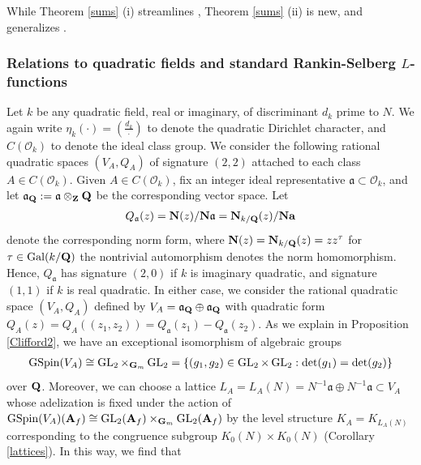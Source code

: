 \documentclass{amsart}
\theoremstyle{definition}
\theoremstyle{definition}
\theoremstyle{definition}
\begin{document}
While Theorem \ref{sums} (i) streamlines \cite[Theorem 4.7]{BY}, Theorem \ref{sums} (ii) is new, and generalizes \cite{VO}.

\subsubsection{Relations to quadratic fields and standard Rankin-Selberg $L$-functions}

Let $k$ be any quadratic field, real or imaginary, of discriminant $d_k$ prime to $N$.
We again write $\eta_k(\cdot) = (\frac{d_k}{\cdot})$ to denote the quadratic Dirichlet character, and $C(\mathcal{O}_k)$ to denote the ideal class group. 
We consider the following rational quadratic spaces $(V_A, Q_A)$ of signature $(2,2)$ attached to each class $A \in C(\mathcal{O}_k)$. 
Given $A \in C(\mathcal{O}_k)$, fix an integer ideal representative $\mathfrak{a} \subset \mathcal{O}_k$, and let 
$\mathfrak{a}_{\bf{Q}} := \mathfrak{a} \otimes_{\bf{Z}} {\bf{Q}}$ be the corresponding vector space. 
Let \begin{align*} Q_{\mathfrak{a}}(z) = {\bf{N}}(z)/{\bf{N}} \mathfrak{a} = {\bf{N}}_{k/{\bf{Q}}}(z)/ {\bf{N}} {\bf{a}} \end{align*} denote the corresponding norm form,
where ${\bf{N}}(z) = {\bf{N}}_{k/{\bf{Q}}}(z) = z z^{\tau}$ for $\tau \in \operatorname{Gal}(k/{\bf{Q}})$ the nontrivial automorphism denotes
the norm homomorphism. Hence, $Q_{\mathfrak{a}}$ has signature $(2, 0)$ if $k$ is imaginary quadratic, and signature $(1,1)$ if $k$ is real quadratic.
In either case, we consider the rational quadratic space $(V_A, Q_A)$ defined by $V_A = \mathfrak{a}_{\bf{Q}} \oplus \mathfrak{a}_{\bf{Q}}$ with
quadratic form $Q_A(z) = Q_A((z_1, z_2)) = Q_{\mathfrak{a}}(z_1) - Q_{\mathfrak{a}}(z_2)$. 
As we explain in Proposition \ref{Clifford2}, we have an exceptional isomorphism of algebraic groups 
\begin{align*} \operatorname{GSpin}(V_A) \cong  \operatorname{GL}_2 \times_{{\bf{G}}_m} \operatorname{GL}_2
= \left\lbrace (g_1, g_2) \in \operatorname{GL}_2 \times \operatorname{GL}_2: \det(g_1)=\det(g_2) \right\rbrace \end{align*} over ${\bf{Q}}$.
Moreover, we can choose a lattice $L_A = L_A(N) = N^{-1} \mathfrak{a} \oplus N^{-1} \mathfrak{a} \subset V_A$ whose 
adelization is fixed under the action of $\operatorname{GSpin}(V_A)({\bf{A}}_f) \cong  \operatorname{GL}_2({\bf{A}}_f) \times_{{\bf{G}}_m} \operatorname{GL}_2({\bf{A}}_f)$ 
by the level structure $K_A = K_{L_A(N)}$ corresponding to the congruence subgroup $K_0(N) \times K_0(N)$ (Corollary \ref{lattices}). In this way, we find that 
\end{document}
